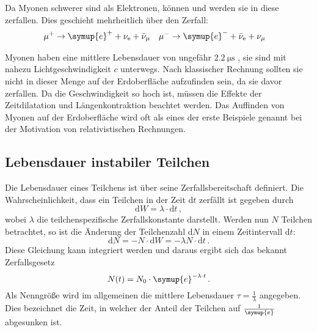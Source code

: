         \noindent Da Myonen schwerer sind als Elektronen, können und werden sie in diese zerfallen. Dies geschieht mehrheitlich über den Zerfall:
        \begin{align*}
            \mu^+ &\rightarrow \symup{e}^+ + \nu_{\text{e}} + \bar{\nu}_{\mu}   & \mu^- &\rightarrow \symup{e}^- + \bar{\nu}_\text{e} + \nu_{\mu} 
        \end{align*}

        \noindent Myonen haben eine mittlere Lebensdauer von ungefähr $\SI{2.2}{\micro\second}$ \cite{pdg}, sie sind mit nahezu Lichtgeschwindigkeit $c$ unterwegs. Nach klassischer Rechnung sollten 
        sie nicht in dieser Menge auf der Erdoberfläche aufzufinden sein, da sie davor zerfallen. Da die Geschwindigkeit so hoch ist, müssen die Effekte der Zeitdilatation und Längenkontraktion
        beachtet werden. Das Auffinden von Myonen auf der Erdoberfläche wird oft als eines der erste Beispiele genannt bei der Motivation von relativistischen Rechnungen. 

    \subsection{Lebensdauer instabiler Teilchen}

        \noindent Die Lebensdauer eines Teilchens ist über seine Zerfallsbereitschaft definiert. Die Wahrscheinlichkeit, dass ein Teilchen in der Zeit $\text{d}t$ zerfällt ist gegeben 
        durch 
        \begin{equation*}
            \text{d}W = \lambda \cdot \text{d}t \, ,
        \end{equation*}
        wobei $\lambda$ die teilchenspezifische Zerfallskonstante darstellt. Werden nun $N$ Teilchen betrachtet, so ist die Änderung der Teilchenzahl $\text{d}N$ in einem  
        Zeitintervall $\text{d} t$:
        \begin{equation*}
            \text{d} N = -N \cdot \text{d} W = - \lambda  N \cdot \text{d}t \, .
        \end{equation*}
        Diese Gleichung kann integriert werden und daraus ergibt sich das bekannt Zerfallsgesetz 
        \begin{equation*}
            N(t) = N_0 \cdot \symup{e}^{- \lambda \cdot t}\, .
        \end{equation*}
        Als Nenngröße wird im allgemeinen die mittlere Lebensdauer $\tau = \frac{1}{\lambda}$ angegeben. Dies bezeichnet die Zeit, in welcher der Anteil der Teilchen auf $\frac{1}{\symup{e}}$
        abgesunken ist. 

